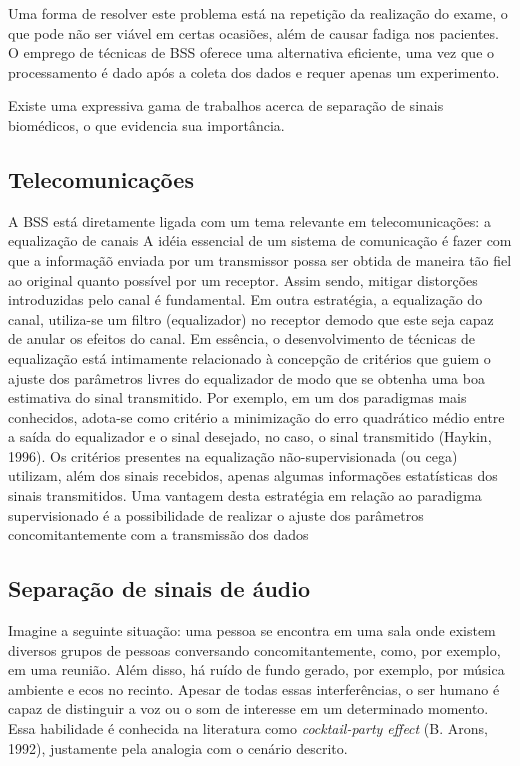     Uma forma de resolver este problema está na repetição da realização do exame, o que pode não ser viável em certas ocasiões, além de causar fadiga nos pacientes. O emprego de técnicas de BSS oferece uma alternativa eficiente, uma vez que o processamento é dado após a coleta dos dados e requer apenas um experimento.
    
    Existe uma expressiva gama de trabalhos acerca de separação de sinais biomédicos, o que evidencia sua importância.
    
\subsection{Telecomunicações}

    A BSS está diretamente ligada com um tema relevante em telecomunicações: a equalização de canais A idéia essencial de um sistema de comunicação é fazer com que a informaçãõ enviada por um transmissor possa ser obtida de maneira tão fiel ao original quanto possível por um receptor. Assim sendo, mitigar distorções introduzidas pelo canal é fundamental. Em outra estratégia, a equalização do canal, utiliza-se um filtro (equalizador) no receptor demodo que este seja capaz de anular os efeitos do canal. Em essência, o desenvolvimento de técnicas de equalização está intimamente relacionado à concepção de critérios que guiem o ajuste dos parâmetros livres do equalizador de modo que se obtenha uma boa estimativa do sinal transmitido.
    Por exemplo, em um dos paradigmas mais conhecidos, adota-se como critério a minimização do erro quadrático médio     entre a saída do equalizador e o sinal desejado, no caso, o sinal transmitido (Haykin, 1996). Os critérios presentes na equalização não-supervisionada (ou cega) utilizam, além dos sinais recebidos, apenas algumas informações estatísticas dos sinais transmitidos. Uma vantagem desta estratégia em relação ao paradigma supervisionado é a possibilidade de realizar o ajuste dos parâmetros concomitantemente com a transmissão dos dados
    
\subsection{Separação de sinais de áudio}

    Imagine a seguinte situação: uma pessoa se encontra em uma sala onde existem diversos grupos de pessoas conversando concomitantemente, como, por exemplo, em uma reunião. Além disso, há ruído de fundo gerado, por exemplo, por música ambiente e ecos no recinto. Apesar de todas essas interferências, o ser humano é capaz de distinguir a voz ou o som de interesse em um determinado momento. Essa habilidade é conhecida na literatura como \textit{cocktail-party effect} (B. Arons, 1992), justamente pela analogia com o cenário descrito.

